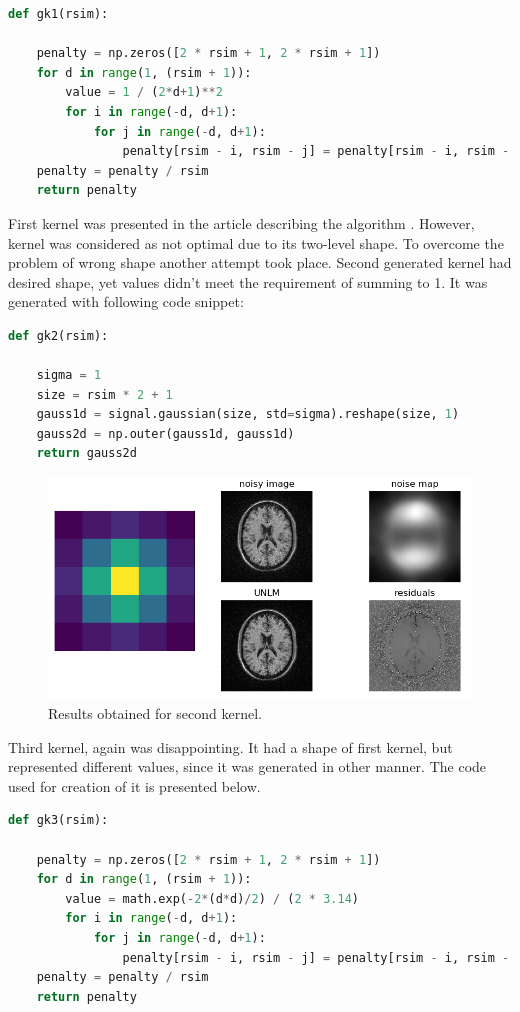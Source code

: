 \begin{lstlisting}[language=Python, caption = Gaussian kernel proposed by authors of algorithm.]
def gk1(rsim):

	penalty = np.zeros([2 * rsim + 1, 2 * rsim + 1])
	for d in range(1, (rsim + 1)):
		value = 1 / (2*d+1)**2
		for i in range(-d, d+1):
			for j in range(-d, d+1):
				penalty[rsim - i, rsim - j] = penalty[rsim - i, rsim - j] + value
	penalty = penalty / rsim
	return penalty
\end{lstlisting}

First kernel was presented in the article describing the algorithm \cite{5a1}. However, kernel was considered as not optimal due to its two-level shape. To overcome the problem of wrong shape another attempt took place. Second generated kernel had desired shape, yet values didn't meet the requirement of summing to 1. It was generated with following code snippet:

\begin{lstlisting}[language=Python, caption = Second gaussian kernel used in tests.]
def gk2(rsim):

	sigma = 1
	size = rsim * 2 + 1
	gauss1d = signal.gaussian(size, std=sigma).reshape(size, 1)
	gauss2d = np.outer(gauss1d, gauss1d)
	return gauss2d
\end{lstlisting}

\begin{figure}[H]
	\centering{}
	\includegraphics[scale=0.7]{figures/module05/gk2results}
	\caption{Results obtained for second kernel.} 
\end{figure} 

Third kernel, again was disappointing. It had a shape of first kernel, but represented different values, since it was generated in other manner. The code used for creation of it is presented below.

\begin{lstlisting}[language=Python, caption = Third gaussian kernel used in tests.]
def gk3(rsim):

	penalty = np.zeros([2 * rsim + 1, 2 * rsim + 1])
	for d in range(1, (rsim + 1)):
		value = math.exp(-2*(d*d)/2) / (2 * 3.14)
		for i in range(-d, d+1):
			for j in range(-d, d+1):
				penalty[rsim - i, rsim - j] = penalty[rsim - i, rsim - j] + value
	penalty = penalty / rsim
	return penalty
\end{lstlisting}

